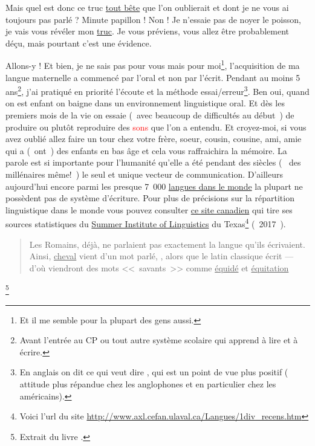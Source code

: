 Mais quel est donc ce truc \underline{tout bête} que l'on oublierait et dont je
ne vous ai toujours pas parlé ? Minute papillon ! Non ! Je n'essaie
pas de noyer le poisson, je vais vous révéler mon \underline{truc}. Je vous
préviens, vous allez être probablement déçu, mais pourtant c'est une
évidence. \par
Allons-y ! Et bien, je ne sais pas pour vous mais pour moi\footnote{Et il me
semble pour la plupart des gens aussi.}, l'acquisition de ma langue
maternelle a commencé par l'oral et non par l'écrit. Pendant au moins
5 ans\footnote{Avant l'entrée au CP ou tout autre système scolaire qui
apprend à lire et à écrire.}, j'ai pratiqué en priorité l'écoute et la
méthode essai/erreur\footnote{En anglais on dit  ce qui veut
dire , qui est un point de vue plus positif (
attitude plus répandue chez les anglophones et en particulier chez les américains).}. Ben
oui, quand on est enfant on baigne dans un environnement linguistique
oral. Et dès les premiers mois de la vie on essaie (~avec beaucoup de
difficultés au début~) de produire ou plutôt reproduire des \textcolor{red}{sons} que
l'on a entendu. Et croyez-moi, si vous avez oublié allez faire un tour
chez votre frère, soeur, cousin, cousine, ami, amie qui a (~ont~) des
enfants en bas âge et cela vous raffraichira la mémoire. La parole est
si importante pour l'humanité qu'elle a été pendant des siècles (~ des
millénaires même!~) le seul et unique vecteur de
communication. D'ailleurs aujourd'hui encore parmi les presque 7~000
\href{http://www.museedelhomme.fr/fr/combien-langues-sont-parlees-monde}{langues dans le monde} la plupart ne possèdent pas de système
d'écriture. Pour plus de précisions sur la répartition linguistique
dans le monde vous pouvez consulter \href{http://www.axl.cefan.ulaval.ca/Langues/1div\_recens.htm}{ce site canadien} qui tire ses
sources statistiques du \underline{Summer Institute of Linguistics} du
Texas\footnote{Voici l'url du site
  \url{http://www.axl.cefan.ulaval.ca/Langues/1div_recens.htm}}
(~2017~).\par


\begin{quote}
Les Romains, déjà, ne parlaient pas exactement la langue qu'ils
écrivaient. Ainsi, \underline{cheval} vient d'un mot parlé, , alors
que le latin classique écrit  --- d'où viendront des mots <<~savants~>> comme \underline{équidé} et \underline{équitation}
\end{quote}\footnote{Extrait du livre \FL.}

